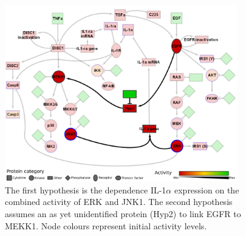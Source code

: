 \documentclass{bmcart}
\begin{document}
\def\largeModelScale{0.18}%
\def\legendScalaColori{0.21}%
\def\legendScalaForme{0.21}%
\def\scalaGrafici{0.0709}%
\begin{figure}[!tpb]
\begin{minipage}{\textwidth}
\centering
\includegraphics[width=0.9\textwidth]{images/large_network_hypotheses7_complete}
\caption{
The first hypothesis is the dependence IL-1$\alpha$ expression on the
combined activity of ERK and JNK1. The second hypothesis assumes an as yet unidentified protein (Hyp2) to link EGFR to MEKK1.
Node colours represent initial activity levels.}\label{fig:large-model-hypotheses}
\end{minipage}
\end{figure}
\end{document}
